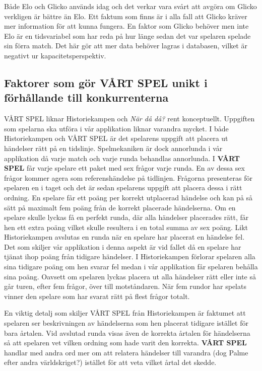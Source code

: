 \documentclass[a4paper, 11pt]{article}
\begin{document}
Både Elo och Glicko används idag och det verkar vara svårt att avgöra om Glicko verkligen är bättre än Elo\cite{stackchess}. Ett faktum som finns är i alla fall att Glicko kräver mer information för att kunna fungera. En faktor som Glicko behöver men inte Elo är en tidsvariabel som har reda på hur länge sedan det var spelaren spelade sin förra match\cite{glickoex}. Det här gör att mer data behöver lagras i databasen, vilket är negativt ur kapacitetsperspektiv.

\subsection{Faktorer som gör VÅRT SPEL unikt i förhållande till konkurrenterna}
VÅRT SPEL liknar Historiekampen och \textit{När då då?} rent konceptuellt. Uppgiften som spelarna ska utföra i vår applikation liknar varandra mycket. I både Historiekampen och VÅRT SPEL är det spelarens uppgift att placera ut händelser rätt på en tidslinje. Spelmekaniken är dock annorlunda i vår applikation då varje match och varje runda behandlas annorlunda. I \textbf{VÅRT SPEL} får varje spelare ett paket med sex frågor varje runda. En av dessa sex frågor kommer agera som referenshändelse på tidlinjen. Frågorna presenteras för spelaren en i taget och det är sedan spelarens uppgift att placera dessa i rätt ordning. En spelare får ett poäng per korrekt utplacerad händelse och kan på så sätt på maximalt fem poäng från de korrekt placerade händelserna. Om en spelare skulle lyckas få en perfekt runda, där alla händelser placerades rätt, får hen ett extra poäng vilket skulle resultera i en total summa av sex poäng. Likt Historiekampen avslutas en runda när en spelare har placerat en händelse fel. Det som skiljer vår applikation i denna aspekt är vid fallet då en spelare har tjänat ihop poäng från tidigare händelser. I Historiekampen förlorar spelaren alla sina tidigare poäng om hen svarar fel medan i vår applikation får spelaren behålla sina poäng. Oavsett om spelaren lyckas placera ut alla händelser rätt eller inte så går turen, efter fem frågor, över till motståndaren. När fem rundor har spelats vinner den spelare som har svarat rätt på flest frågor totalt.  

En viktig detalj som skiljer VÅRT SPEL från Historiekampen är faktumet att spelaren ser beskrivningen av händelserna som hen placerat tidigare istället för bara årtalen. Vid avslutad runda visas även de korrekta årtalen för händelserna så att spelaren vet vilken ordning som hade varit den korrekta. \textbf{VÅRT SPEL} handlar med andra ord mer om att relatera händelser till varandra (dog Palme efter andra världskriget?) istället för att veta vilket årtal det skedde.
\end{document}
